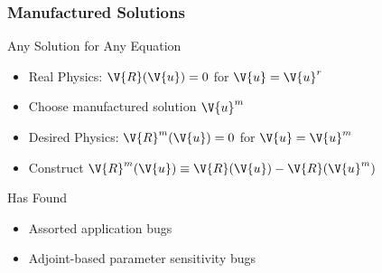 \begin{frame}
\frametitle{Manufactured Solutions}
\begin{block}{Any Solution for Any Equation}
\begin{itemize}
\item Real Physics: $\V{R}(\V{u}) = 0$ for $\V{u} = \V{u}^r$
\item Choose manufactured solution $\V{u}^m$
\item Desired Physics: $\V{R}^m(\V{u}) = 0$ for $\V{u} = \V{u}^m$
\item Construct $\V{R}^m(\V{u}) \equiv \V{R}(\V{u}) - \V{R}(\V{u}^m)$
\end{itemize}
\end{block}

\pause

\begin{block}{Has Found}
\begin{itemize}
\item Assorted application bugs
\item Adjoint-based parameter sensitivity bugs
\end{itemize}
\end{block}
\end{frame}

